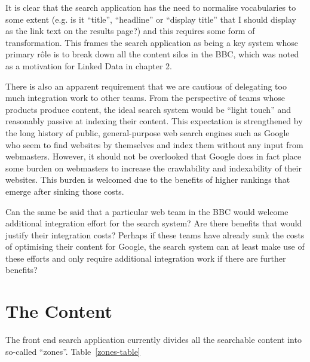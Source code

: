 It is clear that the search application has the need to normalise vocabularies
to some extent (e.g. is it ``title'', ``headline'' or ``display title''
that I should display as the link text on the results page?) and this requires
some form of transformation. This frames the search application as being a
key system whose primary r\^ole is to break down all the content silos in the
BBC, which was noted as a motivation for Linked Data in chapter 2.

There is also an apparent requirement that we are cautious of delegating
too much integration work to other teams. From the perspective of teams
whose products produce content, the ideal search system would be
``light touch'' and reasonably passive at indexing their content. This
expectation is strengthened by the long history of public, general-purpose
web search engines such as Google who seem to find websites by themselves
and index them without any input from webmasters. However, it should
not be overlooked that Google does in fact place some burden on webmasters
to increase the crawlability and indexability of their websites. This
burden is welcomed due to the benefits of higher rankings that emerge
after sinking those costs.

Can the same be said that a particular web team
in the BBC would welcome additional integration effort for the search system?
Are there benefits that would justify their integration costs? Perhaps if
these teams have already sunk the costs of optimising their content for
Google, the search system can at least make use of these efforts and only
require additional integration work if there are further benefits?

\section{The Content}
\label{content}

The front end search application currently divides all the searchable
content into so-called ``zones''. Table~\ref{zones-table}

